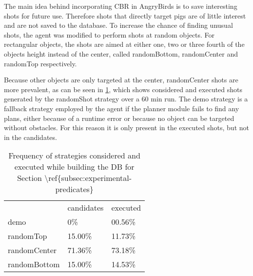 The main idea behind incorporating CBR in AngryBirds is to save interesting shots for future use. Therefore shots that directly target pigs are of little interest and are not saved to the database.
To increase the chance of finding unusual shots, the agent was modified to perform shots at random objects. For rectangular objects, the shots are aimed at either one, two or three fourth of the objects height instead of the center, called randomBottom, randomCenter and randomTop respectively.

Because other objects are only targeted at the center, randomCenter shots are more prevalent, as can be seen in \ref{tab:strat-distribution}, which shows considered and executed shots generated by the randomShot strategy over a 60 min run.
The demo strategy is a fallback strategy employed by the agent if the planner module fails to find any plans, either because of a runtime error or because no object can be targeted without obstacles. For this reason it is only present in the executed shots, but not in the candidates.


\begin{table}[b]
    \begin{tabular}{lll}
                     & candidates & executed \\
        demo         & 0\%        & 00.56\%  \\
        randomTop    & 15.00\%    & 11.73\%  \\
        randomCenter & 71.36\%    & 73.18\%  \\
        randomBottom & 15.00\%    & 14.53\%
    \end{tabular}
    \caption{Frequency of strategies considered and executed while building the DB for Section \textbackslash{}ref\{subsec:experimental-predicates\}}
    \label{tab:strat-distribution}
\end{table}